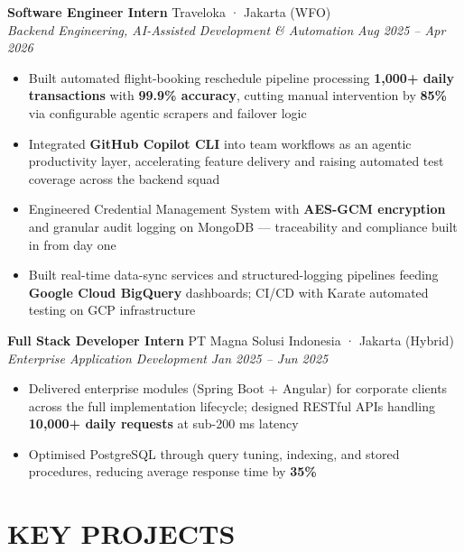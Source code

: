\documentclass[10pt,a4paper]{article}
\newcommand{\experienceheader}[4]{
    \textbf{#1} \hfill #2 \\
    \textit{#3} \hfill \textit{#4}
}
\begin{document}
\experienceheader{Software Engineer Intern}{Traveloka · Jakarta (WFO)}{Backend Engineering, AI-Assisted Development \& Automation}{Aug 2025 -- Apr 2026}
\begin{itemize}[leftmargin=*, itemsep=0.5pt, topsep=1pt]
    \item Built automated flight-booking reschedule pipeline processing \textbf{1,000+ daily transactions} with \textbf{99.9\% accuracy}, cutting manual intervention by \textbf{85\%} via configurable agentic scrapers and failover logic
    \item Integrated \textbf{GitHub Copilot CLI} into team workflows as an agentic productivity layer, accelerating feature delivery and raising automated test coverage across the backend squad
    \item Engineered Credential Management System with \textbf{AES-GCM encryption} and granular audit logging on MongoDB --- traceability and compliance built in from day one
    \item Built real-time data-sync services and structured-logging pipelines feeding \textbf{Google Cloud BigQuery} dashboards; CI/CD with Karate automated testing on GCP infrastructure
\end{itemize}

\vspace{1pt}

\experienceheader{Full Stack Developer Intern}{PT Magna Solusi Indonesia · Jakarta (Hybrid)}{Enterprise Application Development}{Jan 2025 -- Jun 2025}
\begin{itemize}[leftmargin=*, itemsep=0.5pt, topsep=1pt]
    \item Delivered enterprise modules (Spring Boot + Angular) for corporate clients across the full implementation lifecycle; designed RESTful APIs handling \textbf{10,000+ daily requests} at sub-200 ms latency
    \item Optimised PostgreSQL through query tuning, indexing, and stored procedures, reducing average response time by \textbf{35\%}
\end{itemize}

\vspace{-5pt}

\section*{KEY PROJECTS}
\end{document}

